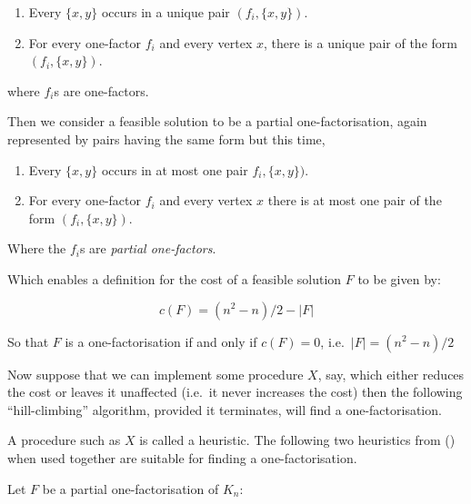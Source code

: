 \documentclass[
  11pt,
  a4paper]{book}
\begin{document}
\begin{enumerate}
\def\labelenumi{\arabic{enumi}.}
\item
  Every \(\{x, y\}\) occurs in a unique pair
  \((f_i, \{x, y\})\).
\item
  For every one-factor \(f_i\) and every vertex \(x\),
  there is a unique pair of the form \((f_i, \{x, y\})\).
\end{enumerate}

where \(f_i\)s are one-factors.

Then we consider a feasible solution to be a partial
one-factorisation, again represented by pairs having the
same form but this time,

\begin{enumerate}
\def\labelenumi{\arabic{enumi}.}
\item
  Every \(\{x, y\}\) occurs in at most one pair
  \(f_i, \{x, y\})\).
\item
  For every one-factor \(f_i\) and every vertex \(x\) there
  is at most one pair of the form \((f_i, \{x, y\})\).
\end{enumerate}

Where the \(f_i\)s are \emph{partial one-factors}.

Which enables a definition for the cost of a feasible
solution \(F\) to be given by:

\[c(F) = (n^2 - n)/2 - |F|\]

So that \(F\) is a one-factorisation if and only if
\(c(F) = 0\), i.e.~\(|F| = (n^2 - n)/2\)

Now suppose that we can implement some procedure \(X\), say,
which either reduces the cost or leaves it unaffected
(i.e.~it never increases the cost) then the following
``hill-climbing'' algorithm, provided it terminates,
will find a one-factorisation.

\begin{algorithm}[H]
\end{algorithm}

A procedure such as \(X\) is called a heuristic.
The following two heuristics from
(\textcite{dinitz_hill-climbing_1987})
when used together are suitable for finding a
one-factorisation.

Let \(F\) be a partial one-factorisation of \(K_n\):

\begin{algorithm}[H]
\caption{$H_1$}
\end{algorithm}
\end{document}

